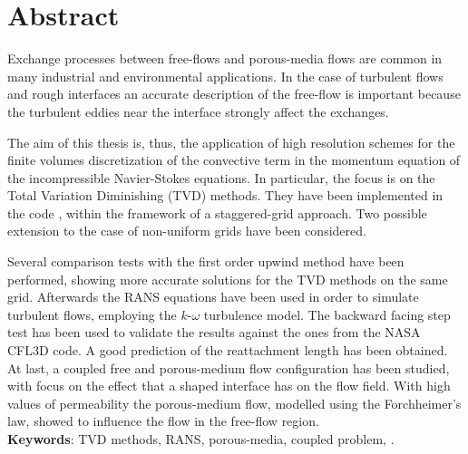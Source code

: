 \chapter*{Abstract}
Exchange processes between free-flows and porous-media flows are common in many 
industrial and environmental applications. In the case of turbulent flows and 
rough interfaces an accurate description of the free-flow is important because 
the turbulent eddies near the interface strongly affect the exchanges.

The aim of this thesis is, thus, the application of high resolution schemes for 
the finite volumes discretization of the convective term in the momentum 
equation of the incompressible Navier-Stokes equations. In particular, the 
focus is on the Total Variation Diminishing (TVD) methods. They have been 
implemented in the code \DUMUX, within the framework of a staggered-grid 
approach. Two possible extension to the case of non-uniform grids have been 
considered.

Several comparison tests with the first order upwind method have been 
performed, showing more accurate solutions for the TVD methods on the same grid.
Afterwards the RANS equations have been used in order to simulate turbulent 
flows, employing the $k\text{-}\omega$ turbulence model. The backward facing 
step test has been used to validate the results against the 
ones from the NASA CFL3D code. A good prediction of the reattachment length has 
been obtained. At last, a coupled free and porous-medium flow configuration has 
been studied, with focus on the effect that a shaped interface has on the flow 
field. With high values of permeability the porous-medium flow, modelled using 
the Forchheimer's law, showed to influence the flow in the free-flow region.
\\[\baselineskip]
\textbf{Keywords}: TVD methods, RANS, porous-media, coupled problem, \DUMUX.